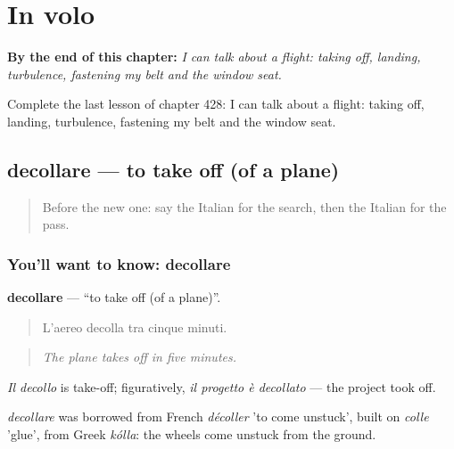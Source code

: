 
\chapter{In volo}
\label{ch:it-in-volo}

\begin{chapteropening}
\textbf{By the end of this chapter:} \emph{I can talk about a flight: taking off, landing, turbulence, fastening my belt and the window seat.}

Complete the last lesson of chapter 428: I can talk about a flight: taking off, landing, turbulence, fastening my belt and the window seat.
\end{chapteropening}

\section[decollare]{decollare — to take off (of a plane)}

\label{lesson:IT-C428-decollare}



\begin{quote}
Before the new one: say the Italian for the search, then the Italian for the pass.
\end{quote}

\subsection*{You'll want to know: decollare}
\textbf{decollare} — \textquotedblleft{}to take off (of a plane)\textquotedblright{}.

\begin{quote}
L'aereo decolla tra cinque minuti.
\end{quote}

\begin{quote}
\emph{The plane takes off in five minutes.}
\end{quote}

\emph{Il decollo} is take-off; figuratively, \emph{il progetto è decollato} — the project took off.

\begin{cousinweb}
\emph{decollare} was borrowed from French \emph{décoller} 'to come unstuck', built on \emph{colle} 'glue', from Greek \emph{kólla}: the wheels come unstuck from the ground.
\end{cousinweb}

